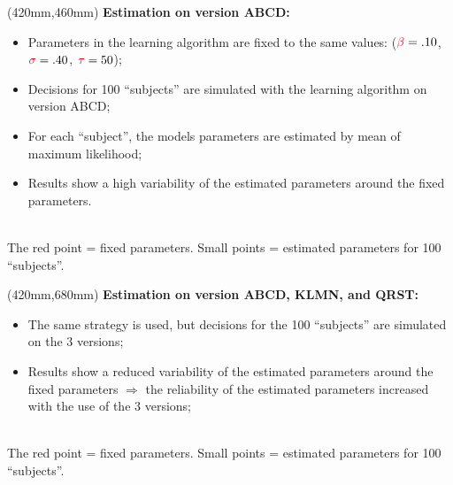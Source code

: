 \documentclass[a0, portrait]{a0poster}
\newcommand{\tcr}[1]{\textcolor{Red}{#1}}
\begin{document}
\begin{textblock*}{340mm}(420mm,460mm)
{\bfseries Estimation on version ABCD:}
\begin{itemize}
\item Parameters in the learning algorithm are fixed to the same values: ($\tcr{\beta}=.10$, $\tcr{\sigma}=.40$, $\tcr{\tau}=50$);
\item Decisions for 100 ``subjects'' are simulated with the learning algorithm on version ABCD;
\item For each ``subject'', the models parameters are estimated by mean of maximum likelihood;
\item Results show a high variability of the estimated parameters around the fixed parameters.
\end{itemize}
\begin{center}
 \\
\small The red point = fixed parameters. Small points = estimated parameters for 100 ``subjects''.
\end{center} \medskip
\end{textblock*}


\begin{textblock*}{340mm}(420mm,680mm)
{\bfseries Estimation on version ABCD, KLMN, and QRST:}
\begin{itemize}
\item The same strategy is used, but decisions for the 100 ``subjects'' are simulated on the 3 versions;
\item Results show a reduced variability of the estimated parameters around the fixed parameters $\Rightarrow$ the reliability of the estimated parameters increased with the use of the 3 versions;
\end{itemize}
\begin{center}
 \\
\small The red point = fixed parameters. Small points = estimated parameters for 100 ``subjects''.
\end{center} \medskip
\end{textblock*}
\end{document}
